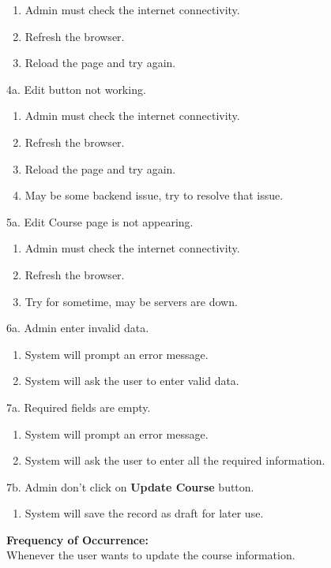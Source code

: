 \documentclass[12pt]{article}
\begin{document}
\begin{enumerate}
\item Admin must check the internet connectivity.
\item Refresh the browser.
\item Reload the page and try again.
\end{enumerate}
4a. Edit button not working.
\begin{enumerate}
\item Admin must check the internet connectivity.
\item Refresh the browser.
\item Reload the page and try again.
\item May be some backend issue, try to resolve that issue.
\end{enumerate}
5a. Edit Course page is not appearing.
\begin{enumerate}
\item Admin must check the internet connectivity.
\item Refresh the browser.
\item Try for sometime, may be servers are down.
\end{enumerate}
6a. Admin enter invalid data.
\begin{enumerate}
\item System will prompt an error message.
\item System will ask the user to enter valid data.
\end{enumerate}
7a. Required fields are empty.
\begin{enumerate}
\item System will prompt an error message.
\item System will ask the user to enter all the required information.
\end{enumerate}
7b. Admin don't click on \textbf{Update Course} button.
\begin{enumerate}
\item System will save the record as draft for later use.
\end{enumerate}
\textbf{Frequency of Occurrence:}\\
Whenever the user wants to update the course information.
\end{document}

